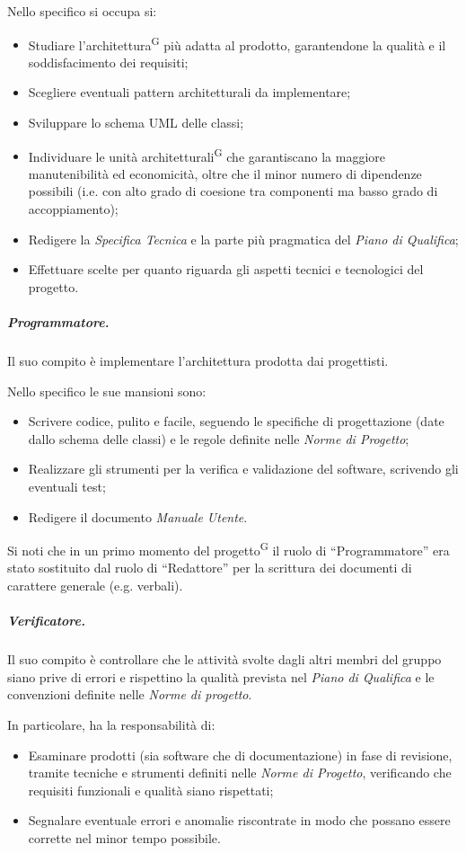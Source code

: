 Nello specifico si occupa si:
\begin{itemize}
    \item Studiare l'architettura\textsuperscript{G} più adatta al prodotto, garantendone la qualità e il soddisfacimento dei requisiti;
    \item Scegliere eventuali pattern architetturali da implementare;
    \item Sviluppare lo schema UML delle classi;
    \item Individuare le unità architetturali\textsuperscript{G} che garantiscano la maggiore manutenibilità ed economicità, oltre che il minor numero di dipendenze possibili (i.e. con alto grado di coesione tra componenti ma basso grado di accoppiamento);
    \item Redigere la \textit{Specifica Tecnica} e la parte più pragmatica del \textit{Piano di Qualifica};
    \item Effettuare scelte per quanto riguarda gli aspetti tecnici e tecnologici del progetto.
\end{itemize}

\subparagraph{Programmatore.}
Il suo compito è implementare l'architettura prodotta dai progettisti.

Nello specifico le sue mansioni sono:
\begin{itemize}
    \item Scrivere codice, pulito e facile, seguendo le specifiche di progettazione (date dallo schema delle classi) e le regole definite nelle \textit{Norme di Progetto};
    \item Realizzare gli strumenti per la verifica e validazione del software, scrivendo gli eventuali test;
    \item Redigere il documento \textit{Manuale Utente}.
\end{itemize}
Si noti che in un primo momento del progetto\textsuperscript{G} il ruolo di ``Programmatore'' era stato sostituito dal ruolo di ``Redattore'' per la scrittura dei documenti di carattere generale (e.g. verbali).

\subparagraph{Verificatore.}
Il suo compito è controllare che le attività svolte dagli altri membri del gruppo siano prive di errori e rispettino la qualità prevista nel \textit{Piano di Qualifica} e le convenzioni definite nelle \textit{Norme di progetto}. %

In particolare, ha la responsabilità di:
\begin{itemize}
    \item Esaminare prodotti (sia software che di documentazione) in fase di revisione, tramite tecniche e strumenti definiti nelle \textit{Norme di Progetto}, verificando che requisiti funzionali e qualità siano rispettati;
    \item Segnalare eventuale errori e anomalie riscontrate in modo che possano essere corrette nel minor tempo possibile.
\end{itemize}

